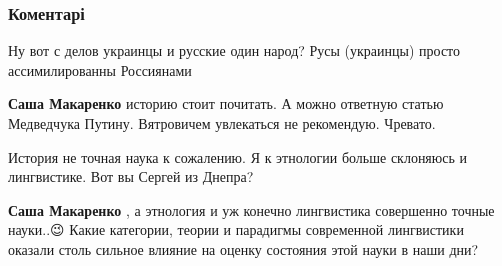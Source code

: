  
 
 
 
 
\subsubsection{Коментарі}
\label{sec:29_07_2021.fb.ozhegov_sergej_775.1.proval_ukrainizacia.cmt}

\begin{itemize}
 
Ну вот с делов украинцы и русские один народ? Русы (украинцы) просто ассимилированны Россиянами

\begin{itemize}
 
\textbf{Саша Макаренко} историю стоит почитать. А можно ответную статью Медведчука Путину.
Вятровичем увлекаться не рекомендую. Чревато.

 
История не точная наука к сожалению. Я к этнологии больше склоняюсь и лингвистике. Вот вы Сергей из Днепра?

 
\textbf{Саша Макаренко} , а этнология и уж конечно лингвистика совершенно точные науки..😉
Какие категории, теории и парадигмы современной лингвистики оказали столь сильное влияние на оценку состояния этой науки в наши дни?


\end{itemize}
\end{itemize}
